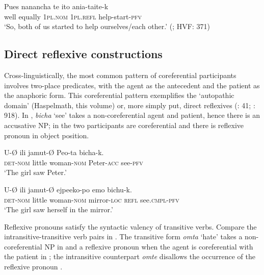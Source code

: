 \documentclass[output=paper]{langscibook}
\begin{document}
\ex
\label{ex:guerrero:15c}
\gll Pues   nanancha  te  ito   ania-taite-k\\
    well    equally  \textsc{1pl.nom}  \textsc{1pl.refl}  help-start-\textsc{pfv}\\
\glt ‘So, both of us started to help ourselves/each other.’ (\citealt{Guerrero2019c}; HVF: 371)
\z
\z

\subsection{Direct reflexive constructions}\label{sec:guerrero:3.2}



Cross-linguistically, the most common pattern of coreferential participants involves two-place predicates, with the agent as the antecedent and the patient as the anaphoric form. This coreferential pattern exemplifies the ‘autopathic domain’ (Haspelmath, this volume) or, more simply put, direct reflexives (\citealt{Kemmer1993}: 41; \citealt{Kazenin2001}: 918). In , \textit{bicha} ‘see’ takes a non-coreferential agent and patient, hence there is an accusative NP; in  the two participants are coreferential and there is reflexive pronoun in object position.



\ea%
    \label{ex:guerrero:16}

\ea
\label{ex:guerrero:16a}
\gll U-Ø   ili   jamut-Ø   Peo-ta   bicha-k.\\
    \textsc{det-nom}  little  woman-\textsc{nom}  Peter-\textsc{acc}  see\textsc{{}-pfv}\\
\glt ‘The girl saw Peter.’

\ex
\label{ex:guerrero:16b}
\gll U-Ø   ili   jamut-Ø  ejpeeko-po  emo   bichu-k.\\
    \textsc{det-nom}  little  woman-\textsc{nom}  mirror-\textsc{loc}  \textsc{refl}  see.\textsc{cmpl-pfv}\\
\glt ‘The girl saw herself in the mirror.’
\z
\z

Reflexive pronouns satisfy the syntactic valency of transitive verbs. Compare the intransitive-transitive verb pairs in . The transitive form \textit{omta} ‘hate’ takes a non-coreferential NP in  and a reflexive pronoun when the agent is coreferential with the patient in ; the intransitive counterpart \textit{omte} disallows the occurrence of the reflexive pronoun .
\end{document}
